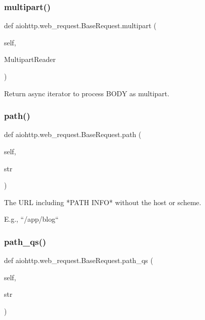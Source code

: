 \subsubsection{\texorpdfstring{multipart()}{multipart()}}
{\footnotesize\ttfamily def aiohttp.\+web\+\_\+request.\+Base\+Request.\+multipart (\begin{DoxyParamCaption}\item[{}]{self,  }\item[{}]{Multipart\+Reader }\end{DoxyParamCaption})}

\begin{DoxyVerb}Return async iterator to process BODY as multipart.\end{DoxyVerb}
 \mbox{\label{classaiohttp_1_1web__request_1_1_base_request_a776eee4b52104bc6db81bf424db82b66}} 
\subsubsection{\texorpdfstring{path()}{path()}}
{\footnotesize\ttfamily def aiohttp.\+web\+\_\+request.\+Base\+Request.\+path (\begin{DoxyParamCaption}\item[{}]{self,  }\item[{}]{str }\end{DoxyParamCaption})}

\begin{DoxyVerb}The URL including *PATH INFO* without the host or scheme.

E.g., ``/app/blog``
\end{DoxyVerb}
 \mbox{\label{classaiohttp_1_1web__request_1_1_base_request_a96fa3cef92b36ea54c4ac3732cd0f3e8}} 
\subsubsection{\texorpdfstring{path\+\_\+qs()}{path\_qs()}}
{\footnotesize\ttfamily def aiohttp.\+web\+\_\+request.\+Base\+Request.\+path\+\_\+qs (\begin{DoxyParamCaption}\item[{}]{self,  }\item[{}]{str }\end{DoxyParamCaption})}

